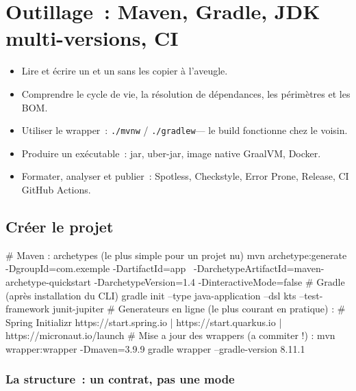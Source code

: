 \chapter{Outillage~: Maven, Gradle, JDK multi-versions, CI}
\label{ch-java-build}

\begin{objectif}
\begin{itemize}
  \item Lire et \'ecrire un  et un  sans les copier \`a l'aveugle.
  \item Comprendre le cycle de vie, la r\'esolution de d\'ependances, les p\'erim\`etres et les BOM.
  \item Utiliser le wrapper~: \verb|./mvnw| / \verb|./gradlew|--- le build fonctionne chez le voisin.
  \item Produire un ex\'ecutable~: jar, uber-jar, image native GraalVM, Docker.
  \item Formater, analyser et publier~: Spotless, Checkstyle, Error Prone, Release, CI GitHub Actions.
\end{itemize}
\end{objectif}

\section{Cr\'eer le projet}

\begin{terminal}
# Maven : archetypes (le plus simple pour un projet nu)
mvn archetype:generate -DgroupId=com.exemple -DartifactId=app \
    -DarchetypeArtifactId=maven-archetype-quickstart -DarchetypeVersion=1.4 -DinteractiveMode=false
# Gradle (apr\`es installation du CLI)
gradle init --type java-application --dsl kts --test-framework junit-jupiter
# Generateurs en ligne (le plus courant en pratique) :
#   Spring Initializr https://start.spring.io  |  https://start.quarkus.io  |  https://micronaut.io/launch
# Mise a jour des wrappers (a commiter !) :
mvn wrapper:wrapper -Dmaven=3.9.9
gradle wrapper --gradle-version 8.11.1
\end{terminal}

\subsection{La structure~: un contrat, pas une mode}

